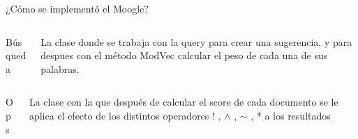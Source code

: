 \begin{frame}
    ¿Cómo se implementó el Moogle?
    \vspace{1cm}
    {
        \begin{columns}
            \begin{column}{0.3\textwidth}
                Búsqueda
            \end{column}
            \begin{column}{0.8\textwidth}
                La clase donde se trabaja con la query
                para crear una sugerencia, y para despues
                con el método ModVec calcular el peso de
                cada una de sus palabras.

            \end{column}
        \end{columns}
    }
    \pause
    \vspace{1cm}
    {
        \begin{columns}
            \begin{column}{0.3\textwidth}
                Ops
            \end{column}
            \begin{column}{0.8\textwidth}
                La clase con la que después de calcular el
                score de cada documento se le aplica
                el efecto de los distintos operadores
                ! , $\wedge$ , $\sim$ , *  a los resultados


            \end{column}
        \end{columns}
    }
\end{frame}


